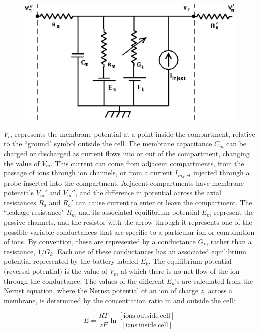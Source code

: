 \documentclass[12pt]{article}
\begin{document}
\begin{figure}[h]
  \centering
 \includegraphics[scale=0.5]{figures/compt.eps}
  \label{fig:compt}
\end{figure}

$V_m$ represents the membrane potential at a point inside the compartment, relative to the ``ground" symbol outside the cell. The membrane capacitance $C_m$ can be charged or discharged as current flows into or out of the compartment, changing the value of $V_m$. This current can come from adjacent compartments, from the passage of ions through ion channels, or from a current $I_{inject}$ injected through a probe inserted into the compartment. Adjacent compartments have membrane potentials $V_m'$ and $V_m''$, and the difference in potential across the axial resistances $R_a$ and $R_a'$ can cause current to enter or leave the compartment. The ``leakage resistance" $R_m$ and its associated equilibrium potential $E_m$ represent the passive channels, and the resistor with the arrow through it represents one of the possible variable conductances that are specific to a particular ion or combination of ions. By convention, these are represented by a conductance $G_k$, rather than a resistance, $1/G_k$. Each one of these conductances has an associated equilibrium potential represented by the battery labeled $E_k$. The equilibrium potential (reversal potential) is the value of $V_m$ at which there is no net flow of the ion through the conductance. The values of the different $E_k$'s are calculated from the Nernst equation, where the Nernst potential of an ion of charge $z$, across a membrane, is determined by the concentration ratio in and outside the cell:

\begin{displaymath}
    E = \frac{R T}{z F} \ln\frac{[\mathrm{ions~outside~cell}]}{[\mathrm{ions~inside~cell}]}
\end{displaymath}
\end{document}
